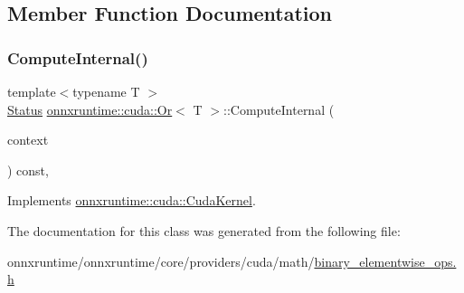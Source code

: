 \subsection{Member Function Documentation}
\mbox{\label{classonnxruntime_1_1cuda_1_1Or_ad39062a46531e065f5e124e60f45baa8}} 
\subsubsection{\texorpdfstring{Compute\+Internal()}{ComputeInternal()}}
{\footnotesize\ttfamily template$<$typename T $>$ \\
\mbox{\hyperlink{classonnxruntime_1_1common_1_1Status}{Status}} \mbox{\hyperlink{classonnxruntime_1_1cuda_1_1Or}{onnxruntime\+::cuda\+::\+Or}}$<$ T $>$\+::Compute\+Internal (\begin{DoxyParamCaption}\item[{\mbox{\hyperlink{classonnxruntime_1_1OpKernelContext}{Op\+Kernel\+Context}} $\ast$}]{context }\end{DoxyParamCaption}) const\hspace{0.3cm}{\ttfamily [override]}, {\ttfamily [virtual]}}



Implements \mbox{\hyperlink{classonnxruntime_1_1cuda_1_1CudaKernel_aca7af04ae448017d6023d30bba231ebb}{onnxruntime\+::cuda\+::\+Cuda\+Kernel}}.



The documentation for this class was generated from the following file\+:\begin{DoxyCompactItemize}
\item 
onnxruntime/onnxruntime/core/providers/cuda/math/\mbox{\hyperlink{binary__elementwise__ops_8h}{binary\+\_\+elementwise\+\_\+ops.\+h}}\end{DoxyCompactItemize}
